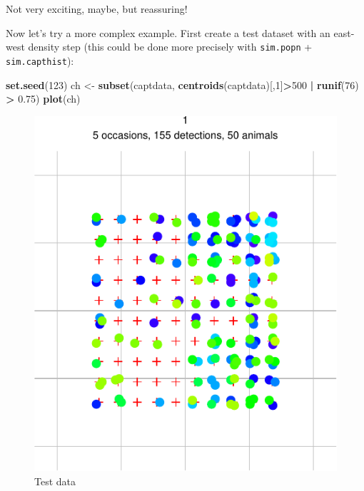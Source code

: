 \documentclass[
]{book}
\newenvironment{Shaded}{\begin{snugshade}}{\end{snugshade}}
\newcommand{\DecValTok}[1]{\textcolor[rgb]{0.00,0.00,0.81}{#1}}
\newcommand{\FloatTok}[1]{\textcolor[rgb]{0.00,0.00,0.81}{#1}}
\newcommand{\FunctionTok}[1]{\textcolor[rgb]{0.13,0.29,0.53}{\textbf{#1}}}
\newcommand{\NormalTok}[1]{#1}
\newcommand{\OtherTok}[1]{\textcolor[rgb]{0.56,0.35,0.01}{#1}}
\newcommand{\SpecialCharTok}[1]{\textcolor[rgb]{0.81,0.36,0.00}{\textbf{#1}}}
\begin{document}
Not very exciting, maybe, but reassuring!

Now let's try a more complex example. First create a test dataset with an east-west density step (this could be done more precisely with \texttt{sim.popn} + \texttt{sim.capthist}):

\begin{Shaded}
\begin{Highlighting}[]
\FunctionTok{set.seed}\NormalTok{(}\DecValTok{123}\NormalTok{)}
\NormalTok{ch }\OtherTok{\textless{}{-}} \FunctionTok{subset}\NormalTok{(captdata, }\FunctionTok{centroids}\NormalTok{(captdata)[,}\DecValTok{1}\NormalTok{]}\SpecialCharTok{\textgreater{}}\DecValTok{500} \SpecialCharTok{|} 
    \FunctionTok{runif}\NormalTok{(}\DecValTok{76}\NormalTok{) }\SpecialCharTok{\textgreater{}} \FloatTok{0.75}\NormalTok{)}
\FunctionTok{plot}\NormalTok{(ch)}
\end{Highlighting}
\end{Shaded}

\begin{figure}
\centering
\includegraphics{SECRbook_files/figure-latex/stepch-1.pdf}
\caption{\label{fig:stepch}Test data}
\end{figure}
\end{document}
